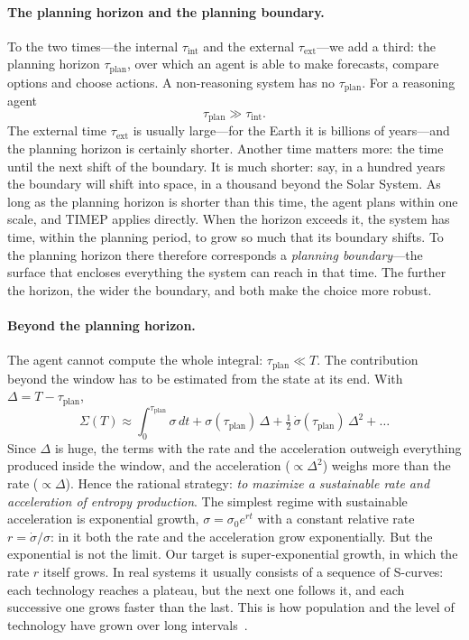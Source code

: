 \documentclass[11pt,a4paper]{article}
\begin{document}
\paragraph{The planning horizon and the planning boundary.}
To the two times---the internal $\tau_{\mathrm{int}}$ and the external $\tau_{\mathrm{ext}}$---we add a third: the planning horizon $\tau_{\mathrm{plan}}$, over which an agent is able to make forecasts, compare options and choose actions. A non-reasoning system has no $\tau_{\mathrm{plan}}$. For a reasoning agent
\begin{equation}
\tau_{\mathrm{plan}}\gg\tau_{\mathrm{int}} .
\end{equation}
The external time $\tau_{\mathrm{ext}}$ is usually large---for the Earth it is billions of years---and the planning horizon is certainly shorter. Another time matters more: the time until the next shift of the boundary. It is much shorter: say, in a hundred years the boundary will shift into space, in a thousand beyond the Solar System. As long as the planning horizon is shorter than this time, the agent plans within one scale, and TIMEP applies directly. When the horizon exceeds it, the system has time, within the planning period, to grow so much that its boundary shifts. To the planning horizon there therefore corresponds a \emph{planning boundary}---the surface that encloses everything the system can reach in that time. The further the horizon, the wider the boundary, and both make the choice more robust.

\paragraph{Beyond the planning horizon.}
The agent cannot compute the whole integral: $\tau_{\mathrm{plan}}\ll T$. The contribution beyond the window has to be estimated from the state at its end. With $\Delta=T-\tau_{\mathrm{plan}}$,
\begin{equation}\label{eq:taylor}
\Sigma(T)\approx\int_0^{\tau_{\mathrm{plan}}}\!\sigma\,dt+\sigma(\tau_{\mathrm{plan}})\,\Delta+\tfrac12\,\dot\sigma(\tau_{\mathrm{plan}})\,\Delta^2+\dots
\end{equation}
Since $\Delta$ is huge, the terms with the rate and the acceleration outweigh everything produced inside the window, and the acceleration ($\propto\Delta^2$) weighs more than the rate ($\propto\Delta$). Hence the rational strategy: \emph{to maximize a sustainable rate and acceleration of entropy production}. The simplest regime with sustainable acceleration is exponential growth, $\sigma=\sigma_0e^{rt}$ with a constant relative rate $r=\dot\sigma/\sigma$: in it both the rate and the acceleration grow exponentially. But the exponential is not the limit. Our target is super-exponential growth, in which the rate $r$ itself grows. In real systems it usually consists of a sequence of S-curves: each technology reaches a plateau, but the next one follows it, and each successive one grows faster than the last. This is how population and the level of technology have grown over long intervals~\cite{foerster1960,kremer1993}.
\end{document}
